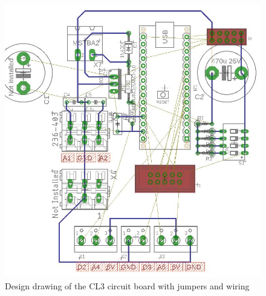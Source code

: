 \begin{figure}
    \centering
    \begin{minipage}{0.55\textwidth}
        \centering
        \includegraphics[width=\textwidth]{images/05/image79.jpg}
        \caption{Design drawing of the CL3 circuit board with jumpers and wiring}
        \label{fig:board-cl3-clamp-electronics}
    \end{minipage}
    \hfill
    \begin{minipage}{0.43\textwidth}
        \centering

\end{minipage}
\end{figure}

